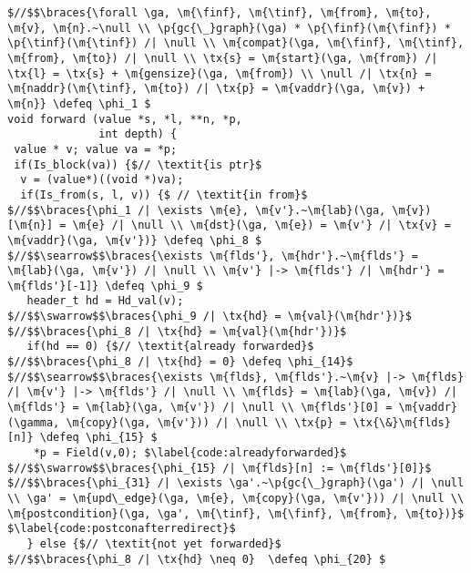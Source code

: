 \begin{figure*}[!ht]
\vspace{-1ex}
  \begin{lstlisting}[multicols=2]
$//$$\braces{\forall \ga, \m{\finf}, \m{\tinf}, \m{from}, \m{to}, \m{v}, \m{n}.~\null \\ \p{gc{\_}graph}(\ga) * \p{\finf}(\m{\finf}) * \p{\tinf}(\m{\tinf}) /| \null \\ \m{compat}(\ga, \m{\finf}, \m{\tinf}, \m{from}, \m{to}) /| \null \\ \tx{s} = \m{start}(\ga, \m{from}) /| \tx{l} = \tx{s} + \m{gensize}(\ga, \m{from}) \\ \null /| \tx{n} = \m{naddr}(\m{\tinf}, \m{to}) /| \tx{p} = \m{vaddr}(\ga, \m{v}) + \m{n}} \defeq \phi_1 $
void forward (value *s, *l, **n, *p, 
              int depth) {
 value * v; value va = *p; 
 if(Is_block(va)) {$// \textit{is ptr}$
  v = (value*)((void *)va); 
  if(Is_from(s, l, v)) {$ // \textit{in from}$
$//$$\braces{\phi_1 /| \exists \m{e}, \m{v'}.~\m{lab}(\ga, \m{v})[\m{n}] = \m{e} /| \null \\ \m{dst}(\ga, \m{e}) = \m{v'} /| \tx{v} = \m{vaddr}(\ga, \m{v'})} \defeq \phi_8 $
$//$$\searrow$$\braces{\exists \m{flds'}, \m{hdr'}.~\m{flds'} = \m{lab}(\ga, \m{v'}) /| \null \\ \m{v'} |-> \m{flds'} /| \m{hdr'} = \m{flds'}[-1]} \defeq \phi_9 $
   header_t hd = Hd_val(v);
$//$$\swarrow$$\braces{\phi_9 /| \tx{hd} = \m{val}(\m{hdr'})}$
$//$$\braces{\phi_8 /| \tx{hd} = \m{val}(\m{hdr'})}$ 
   if(hd == 0) {$// \textit{already forwarded}$
$//$$\braces{\phi_8 /| \tx{hd} = 0} \defeq \phi_{14}$ 
$//$$\searrow$$\braces{\exists \m{flds}, \m{flds'}.~\m{v} |-> \m{flds} /| \m{v'} |-> \m{flds'} /| \null \\ \m{flds} = \m{lab}(\ga, \m{v}) /| \m{flds'} = \m{lab}(\ga, \m{v'}) /| \null \\ \m{flds'}[0] = \m{vaddr}(\gamma, \m{copy}(\ga, \m{v'})) /| \null \\ \tx{p} = \tx{\&}\m{flds}[n]} \defeq \phi_{15} $
    *p = Field(v,0); $\label{code:alreadyforwarded}$
$//$$\swarrow$$\braces{\phi_{15} /| \m{flds}[n] := \m{flds'}[0]}$
$//$$\braces{\phi_{31} /| \exists \ga'.~\p{gc{\_}graph}(\ga') /| \null \\ \ga' = \m{upd\_edge}(\ga, \m{e}, \m{copy}(\ga, \m{v'})) /| \null \\ \m{postcondition}(\ga, \ga', \m{\tinf}, \m{\finf}, \m{from}, \m{to})}$ $\label{code:postconafterredirect}$
   } else {$// \textit{not yet forwarded}$
$//$$\braces{\phi_8 /| \tx{hd} \neq 0}  \defeq \phi_{20} $

\end{lstlisting}
\end{figure*}
